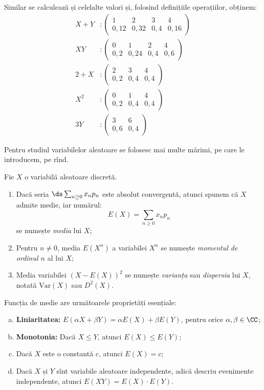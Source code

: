 Similar se calculează și celelalte valori și, folosind definițiile operațiilor,
obținem:
\begin{align*}
  X + Y &: \begin{pmatrix} 1 & 2 & 3 & 4 \\ 0,12 & 0,32 & 0,4 & 0,16 \end{pmatrix} \\
  XY &: \begin{pmatrix} 0 & 1 & 2 & 4 \\ 0,2 & 0,24 & 0,4 & 0,6 \end{pmatrix} \\
  2 + X &: \begin{pmatrix} 2 & 3 & 4 \\ 0,2 & 0,4 & 0,4 \end{pmatrix} \\
  X^2 &: \begin{pmatrix} 0 & 1 & 4 \\ 0,2 & 0,4 & 0,4 \end{pmatrix} \\
  3Y &: \begin{pmatrix} 3 & 6 \\ 0,6 & 0,4 \end{pmatrix}
\end{align*}

\vspace{0.3cm}


Pentru studiul variabilelor aleatoare se folosesc mai multe mărimi, pe care le introducem,
pe rînd.

\begin{definition}\label{def:medie-mom-var}
  Fie $ X $ o variabilă aleatoare discretă.
  \begin{enumerate}[(1)]
  \item Dacă seria $ \ds\sum_{n \geq 0} x_n p_n $ este absolut convergentă, atunci spunem că $ X $
    admite medie, iar numărul:
    \[
      E(X) = \sum_{n \geq 0} x_n p_n
    \]
    se numește \emph{media} lui $ X $;
  \item Pentru $ n \neq 0 $, media $ E(X^n) $ a variabilei $ X^n $ se numește \emph{momentul %
      de ordinul $ n $} al lui $ X $;
  \item Media variabilei $ (X - E(X))^2 $ se numește \emph{varianța} sau \emph{dispersia}
    lui $ X $, notată $ \mathrm{Var}(X) $ sau $ D^2(X) $.
  \end{enumerate}
\end{definition}

Funcția de medie are următoarele proprietăți esențiale:
\begin{enumerate}[(a)]
\item \textbf{Liniaritatea:} $ E(\alpha X + \beta Y) = \alpha E(X) + \beta E(Y) $, pentru
  orice $ \alpha, \beta \in \CC $;
\item \textbf{Monotonia:} Dacă $ X \leq Y $, atunci $ E(X) \leq E(Y) $;
\item Dacă $ X $ este o constantă $ c $, atunci $ E(X) = c $;
\item Dacă $ X $ și $ Y $ sînt variabile aleatoare independente, adică descriu evenimente
  independente, atunci $ E(XY) = E(X) \cdot E(Y) $.
\end{enumerate}

